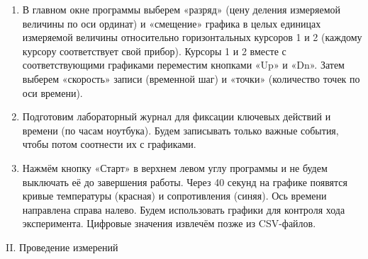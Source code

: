 \documentclass[a4paper,12pt]{article} %
\begin{document}
\begin{enumerate}
    \item В главном окне программы выберем «разряд» (цену деления измеряемой величины по оси ординат) и «смещение» графика в целых единицах измеряемой величины относительно горизонтальных курсоров 1 и 2 (каждому курсору соответствует свой прибор). Курсоры 1 и 2 вместе с соответствующими графиками переместим кнопками «Up» и «Dn». Затем выберем «скорость» записи (временной шаг) и «точки» (количество точек по оси времени). 

    \item Подготовим лабораторный журнал для фиксации ключевых действий и времени (по часам ноутбука). Будем записывать только важные события, чтобы потом соотнести их с графиками.

    \item Нажмём кнопку «Старт» в верхнем левом углу программы и не будем выключать её до завершения работы. Через 40 секунд на графике появятся кривые температуры (красная) и сопротивления (синяя). Ось времени направлена справа налево. Будем использовать графики для контроля хода эксперимента. Цифровые значения извлечём позже из CSV-файлов.
\end{enumerate}


\begin{center}
  \textsf{II. Проведение измерений}
\end{center}
\end{document}
